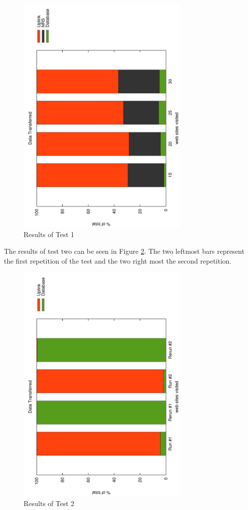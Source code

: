 \begin{figure}
	\centering
		\includegraphics[width=0.75\textwidth, angle=-90]{./img/plots.pdf}
    	\caption{Results of Test 1}
	\label{fig:frontendtest1}
\end{figure}

The results of test two can be seen in Figure \ref{fig:frontendtest2}. The two leftmost bars represent the first repetition of the test and the two right most the second repetition.

\begin{figure}
	\centering
		\includegraphics[width=0.75\textwidth, angle=-90]{./img/rerun.pdf}
    	\caption{Results of Test 2}
	\label{fig:frontendtest2}
\end{figure}

